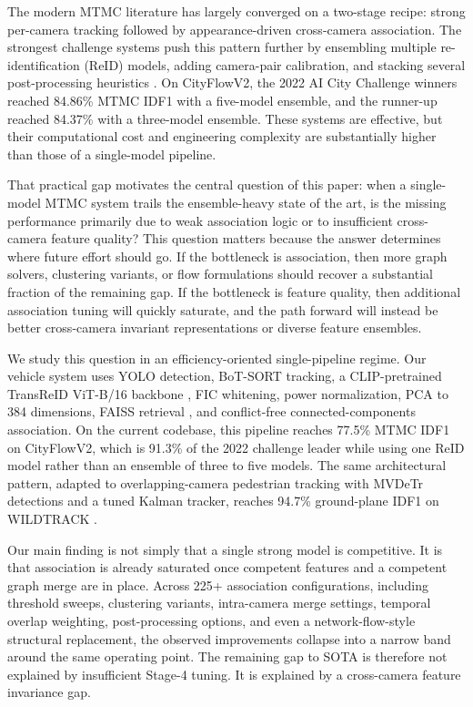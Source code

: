 \documentclass{ieeeaccess}
\begin{document}
The modern MTMC literature has largely converged on a two-stage recipe: strong per-camera tracking followed by appearance-driven cross-camera association. The strongest challenge systems push this pattern further by ensembling multiple re-identification (ReID) models, adding camera-pair calibration, and stacking several post-processing heuristics \cite{aicity2022,aic22winner,aic22sta}. On CityFlowV2, the 2022 AI City Challenge winners reached 84.86\% MTMC IDF1 with a five-model ensemble, and the runner-up reached 84.37\% with a three-model ensemble. These systems are effective, but their computational cost and engineering complexity are substantially higher than those of a single-model pipeline.

That practical gap motivates the central question of this paper: when a single-model MTMC system trails the ensemble-heavy state of the art, is the missing performance primarily due to weak association logic or to insufficient cross-camera feature quality? This question matters because the answer determines where future effort should go. If the bottleneck is association, then more graph solvers, clustering variants, or flow formulations should recover a substantial fraction of the remaining gap. If the bottleneck is feature quality, then additional association tuning will quickly saturate, and the path forward will instead be better cross-camera invariant representations or diverse feature ensembles.

We study this question in an efficiency-oriented single-pipeline regime. Our vehicle system uses YOLO detection, BoT-SORT tracking, a CLIP-pretrained TransReID ViT-B/16 backbone \cite{transreid,clip}, FIC whitening, power normalization, PCA to 384 dimensions, FAISS retrieval \cite{faiss}, and conflict-free connected-components association. On the current codebase, this pipeline reaches 77.5\% MTMC IDF1 on CityFlowV2, which is 91.3\% of the 2022 challenge leader while using one ReID model rather than an ensemble of three to five models. The same architectural pattern, adapted to overlapping-camera pedestrian tracking with MVDeTr detections and a tuned Kalman tracker, reaches 94.7\% ground-plane IDF1 on WILDTRACK \cite{wildtrack}.

Our main finding is not simply that a single strong model is competitive. It is that association is already saturated once competent features and a competent graph merge are in place. Across 225+ association configurations, including threshold sweeps, clustering variants, intra-camera merge settings, temporal overlap weighting, post-processing options, and even a network-flow-style structural replacement, the observed improvements collapse into a narrow band around the same operating point. The remaining gap to SOTA is therefore not explained by insufficient Stage-4 tuning. It is explained by a cross-camera feature invariance gap.
\end{document}
